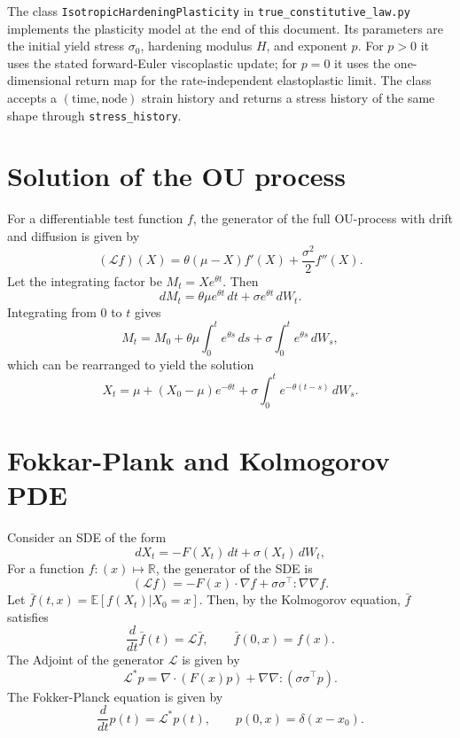 \documentclass[11pt]{article}
\begin{document}
The class \texttt{IsotropicHardeningPlasticity} in
\texttt{true\_constitutive\_law.py} implements the plasticity model at the end
of this document. Its parameters are the initial yield stress $\sigma_0$,
hardening modulus $H$, and exponent $p$. For $p>0$ it uses the stated
forward-Euler viscoplastic update; for $p=0$ it uses the one-dimensional return
map for the rate-independent elastoplastic limit. The class accepts a
$(\text{time},\text{node})$ strain history and returns a stress history of the
same shape through \texttt{stress\_history}.

\section{Solution of the OU process}
\label{a:sec:ou-solution}
For a differentiable test function $f$,
the generator of the full OU-process with drift and diffusion is given by
\begin{equation}
    (\mathcal{L}f)(X)=\theta(\mu-X)f'(X)
    +\frac{\sigma^2}{2}f''(X).
\end{equation}
Let the integrating factor be $M_t=X e^{\theta t}$. Then
\begin{equation}
    dM_t=\theta\mu e^{\theta t}\,dt+\sigma e^{\theta t}\,dW_t.
\end{equation}
Integrating from $0$ to $t$ gives
\begin{equation}
    M_t=M_0+\theta\mu\int_0^t e^{\theta s}\,ds+\sigma\int_0^t e^{\theta s}\,dW_s,
\end{equation}
which can be rearranged to yield the solution
\begin{equation}
    X_t=\mu+(X_0-\mu)e^{-\theta t}
    +\sigma\int_0^t e^{-\theta(t-s)}\,d
    W_s.
\end{equation}
\section{Fokkar-Plank and Kolmogorov PDE}
Consider an SDE of the form
\begin{equation}
    dX_t = -F(X_t)\,dt + \sigma(X_t)\,dW_t,
\end{equation}
For a function $f: (x) \mapsto \mathbb{R}$, the generator of the SDE is
\begin{equation}
    (\mathcal{L}f)=-F(x)\cdot \nabla f
    +\sigma \sigma^\top \colon \nabla \nabla f.
\end{equation}
Let $\bar{f} (t, x) = \mathbb{E}[f(X_t)|X_0 = x]$. Then, by the Kolmogorov equation, $\bar{f}$ satisfies
\begin{equation}
    \frac{d}{dt}\bar{f}(t)=\mathcal{L}\bar{f},\qquad \bar{f}(0, x) = f(x).
\end{equation}
The Adjoint of the generator $\mathcal{L}$ is given by
\begin{equation}
    \mathcal{L}^*p=\nabla\cdot(F(x)p)
    +\nabla\nabla\colon(\sigma \sigma^\top p).
\end{equation}
The Fokker-Planck equation is given by
\begin{equation}
    \frac{d}{dt}p(t)=\mathcal{L}^*p(t),\qquad p(0, x) = \delta(x - x_0).
\end{equation}
\end{document}
